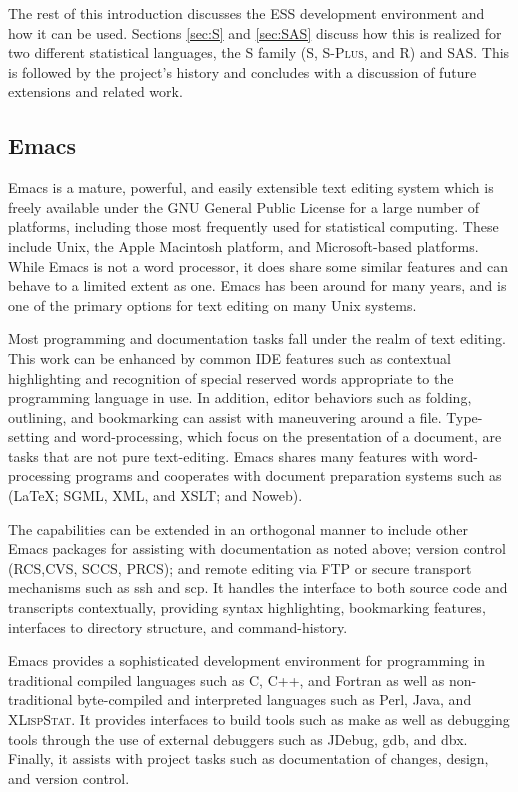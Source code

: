 \documentclass{article}
\newcommand*{\Splus}{\textsc{S-Plus}}
\newcommand*{\XLispStat}{\textsc{XLispStat}}
\begin{document}
The rest of this introduction discusses the ESS development
environment and how it can be used.  Sections \ref{sec:S} and
\ref{sec:SAS} discuss how this is realized for two different
statistical languages, the S family (S, \Splus, and R)
and SAS.  This is followed by the project's history and concludes
with a discussion of future extensions and related work.

\subsection{Emacs}
\label{sec:intro:emacs}

Emacs \citep{RMS:2000} is a mature, powerful, and easily extensible
text editing system which is freely available under the GNU General
Public License for a large number of platforms, including those most
frequently used for statistical computing.  These include Unix, the
Apple Macintosh platform, and Microsoft-based platforms.  While Emacs
is not a word processor, it does share some similar features and can
behave to a limited extent as one.  Emacs has been around for many
years, and is one of the primary options for text editing on many Unix
systems.

Most programming and documentation tasks fall under the realm of text
editing.  This work can be enhanced by common IDE features such as
contextual highlighting and recognition of special reserved words
appropriate to the programming language in use.  In addition, editor
behaviors such as folding, outlining, and bookmarking can assist with
maneuvering around a file.  Type-setting and word-processing, which
focus on the presentation of a document, are tasks that are not pure
text-editing.  Emacs shares many features with word-processing
programs and cooperates with document preparation systems such as
(\LaTeX; SGML, XML, and XSLT; and Noweb).

The capabilities can be extended in an orthogonal manner to include
other Emacs packages for assisting with documentation as noted above;
version control (RCS,CVS, SCCS, PRCS); and remote editing via FTP or
secure transport mechanisms such as ssh and scp.  It handles the
interface to both source code and transcripts contextually, providing
syntax highlighting, bookmarking features, interfaces to directory
structure, and command-history.

Emacs provides a sophisticated development environment for programming
in traditional compiled languages such as C, C++, and Fortran as well
as non-traditional byte-compiled and interpreted languages such as
Perl, Java, and \XLispStat.  It provides interfaces to build tools such as
make as well as debugging tools through the use of external debuggers
such as JDebug, gdb, and dbx.  Finally, it assists with project tasks
such as documentation of changes, design, and version control.
\end{document}
